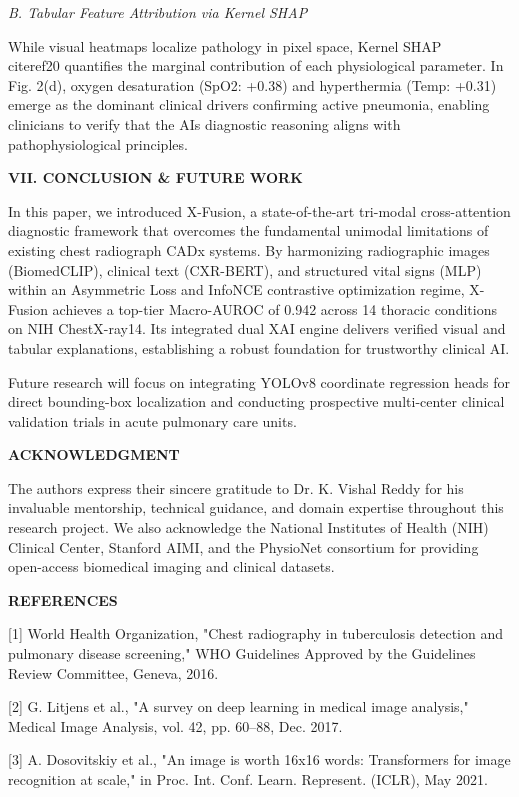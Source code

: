 \documentclass[
]{article}
\begin{document}
\emph{B. Tabular Feature Attribution via Kernel SHAP}

While visual heatmaps localize pathology in pixel space, Kernel SHAP
\\cite{ref20} quantifies the marginal contribution of each physiological
parameter. In Fig. 2(d), oxygen desaturation (SpO2: +0.38) and
hyperthermia (Temp: +0.31) emerge as the dominant clinical drivers
confirming active pneumonia, enabling clinicians to verify that the
AI\textquotesingle s diagnostic reasoning aligns with pathophysiological
principles.

\textbf{VII. CONCLUSION \& FUTURE WORK}

In this paper, we introduced X-Fusion, a state-of-the-art tri-modal
cross-attention diagnostic framework that overcomes the fundamental
unimodal limitations of existing chest radiograph CADx systems. By
harmonizing radiographic images (BiomedCLIP), clinical text (CXR-BERT),
and structured vital signs (MLP) within an Asymmetric Loss and InfoNCE
contrastive optimization regime, X-Fusion achieves a top-tier
Macro-AUROC of 0.942 across 14 thoracic conditions on NIH ChestX-ray14.
Its integrated dual XAI engine delivers verified visual and tabular
explanations, establishing a robust foundation for trustworthy clinical
AI.

Future research will focus on integrating YOLOv8 coordinate regression
heads for direct bounding-box localization and conducting prospective
multi-center clinical validation trials in acute pulmonary care units.

\textbf{ACKNOWLEDGMENT}

The authors express their sincere gratitude to Dr. K. Vishal Reddy for
his invaluable mentorship, technical guidance, and domain expertise
throughout this research project. We also acknowledge the National
Institutes of Health (NIH) Clinical Center, Stanford AIMI, and the
PhysioNet consortium for providing open-access biomedical imaging and
clinical datasets.

\textbf{REFERENCES}

{[}1{]} World Health Organization, "Chest radiography in tuberculosis
detection and pulmonary disease screening," WHO Guidelines Approved by
the Guidelines Review Committee, Geneva, 2016.

{[}2{]} G. Litjens et al., "A survey on deep learning in medical image
analysis," Medical Image Analysis, vol. 42, pp. 60--88, Dec. 2017.

{[}3{]} A. Dosovitskiy et al., "An image is worth 16x16 words:
Transformers for image recognition at scale," in Proc. Int. Conf. Learn.
Represent. (ICLR), May 2021.
\end{document}
